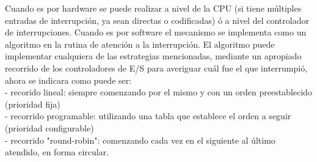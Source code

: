 \documentclass[12pt]{article}
\begin{document}
 Cuando es por hardware se puede realizar a nivel de la CPU (si tiene múltiples entradas de interrupción, ya sean directas o codificadas) ó a nivel del controlador de interrupciones. Cuando es por software el mecanismo se implementa como un algoritmo en la rutina de atención a la interrupción. El algoritmo puede
implementar cualquiera de las estrategias mencionadas, mediante un apropiado recorrido de los controladores de E/S para averiguar cuál fue el que interrumpió, ahora se indicara como puede ser:\\
- recorido lineal: siempre comenzando por el mismo y con un orden preestablecido (prioridad fija)\\
- recorrido programable: utilizando una tabla que establece el orden a seguir (prioridad configurable)\\
- recorrido "round-robin": comenzando cada vez en el siguiente al último
atendido, en forma circular.\cite{aguilerasistemas2015}

    

\end{document}
